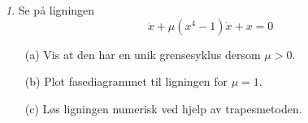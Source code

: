\documentclass{article}
\theoremstyle{plain}
\theoremstyle{definition}
\theoremstyle{remark}
\newtheorem{oppg}{}
\begin{document}
\begin{oppg}
    Se på ligningen
    \begin{equation*}
        \ddot{x} + \mu (x^4 - 1) \dot{x} + x = 0
    \end{equation*}
    \begin{itemize}
        \item[(a)] Vis at den har en unik grensesyklus dersom $\mu > 0$.
        \item[(b)] Plot fasediagrammet til ligningen for $\mu = 1$.
        \item[(c)] Løs ligningen numerisk ved hjelp av trapesmetoden.
    \end{itemize}
\end{oppg}
\end{document}
